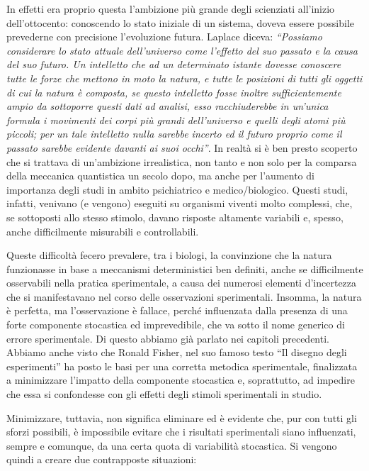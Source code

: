 \documentclass[a4paper,12pt,oneside]{book}
\begin{document}
In effetti era proprio questa l'ambizione più grande degli scienziati all'inizio dell'ottocento: conoscendo lo stato iniziale di un sistema, doveva essere possibile prevederne con precisione l'evoluzione futura. Laplace diceva: \emph{``Possiamo considerare lo stato attuale dell'universo come l'effetto del suo passato e la causa del suo futuro. Un intelletto che ad un determinato istante dovesse conoscere tutte le forze che mettono in moto la natura, e tutte le posizioni di tutti gli oggetti di cui la natura è composta, se questo intelletto fosse inoltre sufficientemente ampio da sottoporre questi dati ad analisi, esso racchiuderebbe in un'unica formula i movimenti dei corpi più grandi dell'universo e quelli degli atomi più piccoli; per un tale intelletto nulla sarebbe incerto ed il futuro proprio come il passato sarebbe evidente davanti ai suoi occhi''}. In realtà si è ben presto scoperto che si trattava di un'ambizione irrealistica, non tanto e non solo per la comparsa della meccanica quantistica un secolo dopo, ma anche per l'aumento di importanza degli studi in ambito psichiatrico e medico/biologico. Questi studi, infatti, venivano (e vengono) eseguiti su organismi viventi molto complessi, che, se sottoposti allo stesso stimolo, davano risposte altamente variabili e, spesso, anche difficilmente misurabili e controllabili.

Queste difficoltà fecero prevalere, tra i biologi, la convinzione che la natura funzionasse in base a meccanismi deterministici ben definiti, anche se difficilmente osservabili nella pratica sperimentale, a causa dei numerosi elementi d'incertezza che si manifestavano nel corso delle osservazioni sperimentali. Insomma, la natura è perfetta, ma l'osservazione è fallace, perché influenzata dalla presenza di una forte componente stocastica ed imprevedibile, che va sotto il nome generico di errore sperimentale. Di questo abbiamo già parlato nei capitoli precedenti. Abbiamo anche visto che Ronald Fisher, nel suo famoso testo ``Il disegno degli esperimenti'' ha posto le basi per una corretta metodica sperimentale, finalizzata a minimizzare l'impatto della componente stocastica e, soprattutto, ad impedire che essa si confondesse con gli effetti degli stimoli sperimentali in studio.

Minimizzare, tuttavia, non significa eliminare ed è evidente che, pur con tutti gli sforzi possibili, è impossibile evitare che i risultati sperimentali siano influenzati, sempre e comunque, da una certa quota di variabilità stocastica. Si vengono quindi a creare due contrapposte situazioni:
\end{document}
